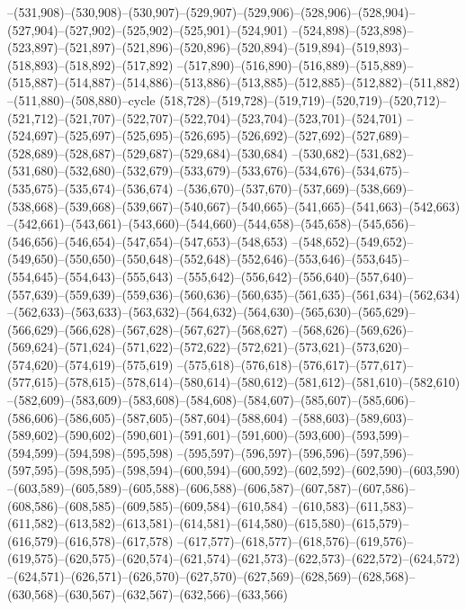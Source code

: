 --(531,908)--(530,908)--(530,907)--(529,907)--(529,906)--(528,906)--(528,904)--(527,904)--(527,902)--(525,902)--(525,901)--(524,901)
--(524,898)--(523,898)--(523,897)--(521,897)--(521,896)--(520,896)--(520,894)--(519,894)--(519,893)--(518,893)--(518,892)--(517,892)
--(517,890)--(516,890)--(516,889)--(515,889)--(515,887)--(514,887)--(514,886)--(513,886)--(513,885)--(512,885)--(512,882)--(511,882)
--(511,880)--(508,880)--cycle
(518,728)--(519,728)--(519,719)--(520,719)--(520,712)--(521,712)--(521,707)--(522,707)--(522,704)--(523,704)--(523,701)--(524,701)
--(524,697)--(525,697)--(525,695)--(526,695)--(526,692)--(527,692)--(527,689)--(528,689)--(528,687)--(529,687)--(529,684)--(530,684)
--(530,682)--(531,682)--(531,680)--(532,680)--(532,679)--(533,679)--(533,676)--(534,676)--(534,675)--(535,675)--(535,674)--(536,674)
--(536,670)--(537,670)--(537,669)--(538,669)--(538,668)--(539,668)--(539,667)--(540,667)--(540,665)--(541,665)--(541,663)--(542,663)
--(542,661)--(543,661)--(543,660)--(544,660)--(544,658)--(545,658)--(545,656)--(546,656)--(546,654)--(547,654)--(547,653)--(548,653)
--(548,652)--(549,652)--(549,650)--(550,650)--(550,648)--(552,648)--(552,646)--(553,646)--(553,645)--(554,645)--(554,643)--(555,643)
--(555,642)--(556,642)--(556,640)--(557,640)--(557,639)--(559,639)--(559,636)--(560,636)--(560,635)--(561,635)--(561,634)--(562,634)
--(562,633)--(563,633)--(563,632)--(564,632)--(564,630)--(565,630)--(565,629)--(566,629)--(566,628)--(567,628)--(567,627)--(568,627)
--(568,626)--(569,626)--(569,624)--(571,624)--(571,622)--(572,622)--(572,621)--(573,621)--(573,620)--(574,620)--(574,619)--(575,619)
--(575,618)--(576,618)--(576,617)--(577,617)--(577,615)--(578,615)--(578,614)--(580,614)--(580,612)--(581,612)--(581,610)--(582,610)
--(582,609)--(583,609)--(583,608)--(584,608)--(584,607)--(585,607)--(585,606)--(586,606)--(586,605)--(587,605)--(587,604)--(588,604)
--(588,603)--(589,603)--(589,602)--(590,602)--(590,601)--(591,601)--(591,600)--(593,600)--(593,599)--(594,599)--(594,598)--(595,598)
--(595,597)--(596,597)--(596,596)--(597,596)--(597,595)--(598,595)--(598,594)--(600,594)--(600,592)--(602,592)--(602,590)--(603,590)
--(603,589)--(605,589)--(605,588)--(606,588)--(606,587)--(607,587)--(607,586)--(608,586)--(608,585)--(609,585)--(609,584)--(610,584)
--(610,583)--(611,583)--(611,582)--(613,582)--(613,581)--(614,581)--(614,580)--(615,580)--(615,579)--(616,579)--(616,578)--(617,578)
--(617,577)--(618,577)--(618,576)--(619,576)--(619,575)--(620,575)--(620,574)--(621,574)--(621,573)--(622,573)--(622,572)--(624,572)
--(624,571)--(626,571)--(626,570)--(627,570)--(627,569)--(628,569)--(628,568)--(630,568)--(630,567)--(632,567)--(632,566)--(633,566)
